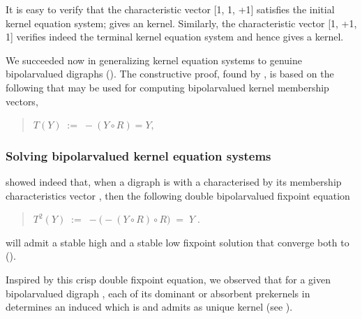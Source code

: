 \documentclass[a4paper,12pt,english]{sphinxhowto}
\begin{document}
\sphinxAtStartPar
It is easy to verify that the characteristic vector {[}\sphinxhyphen{}1, \sphinxhyphen{}1, +1{]} satisfies the initial kernel equation system;  gives an  kernel. Similarly, the characteristic vector {[}\sphinxhyphen{}1, +1, \sphinxhyphen{}1{]} verifies indeed the terminal kernel equation system and hence  gives a  kernel.

\sphinxAtStartPar
We succeeded now in generalizing kernel equation systems to genuine bipolar\sphinxhyphen{}valued digraphs (). The constructive proof, found by , is based on the following  that may be used for computing bipolar\sphinxhyphen{}valued kernel membership vectors,
\begin{quote}

\sphinxAtStartPar
\(T(Y) \; := \; -(Y \circ R) = Y,\)
\end{quote}


\subsubsection{Solving bipolar\sphinxhyphen{}valued kernel equation systems}
\label{\detokenize{pearls:solving-bipolar-valued-kernel-equation-systems}}
\sphinxAtStartPar
{} showed indeed that, when a digraph  is  with a    characterised by its membership characteristics vector , then the following double bipolar\sphinxhyphen{}valued fixpoint equation
\begin{quote}

\sphinxAtStartPar
\(T^2(Y) \; := \; -\big( -(Y \circ R) \circ R) \; = \; Y\;.\)
\end{quote}

\sphinxAtStartPar
will admit a stable high and a stable low fixpoint solution that converge both to  ().

\sphinxAtStartPar
Inspired by this crisp double fixpoint equation, we observed that for a given bipolar\sphinxhyphen{}valued digraph , each of its dominant or absorbent prekernels  in  determines an induced   which is  and admits  as unique kernel (see ).
\end{document}
